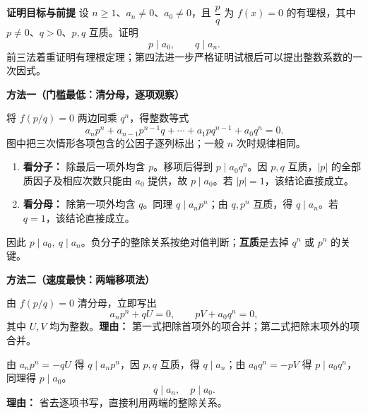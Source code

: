 \begin{proofbox}
    \textbf{\textcolor{CProof}{证明目标与前提}}
    设 $n\ge1$、$a_n\ne0$、$a_0\ne0$，且 $\dfrac pq$ 为 $f(x)=0$ 的有理根，其中 $p\ne0$、$q>0$、$p,q$ 互质。证明
    \[
        p\mid a_0,\qquad q\mid a_n.
    \]
    前三法着重证明有理根定理；第四法进一步严格证明试根后可以提出整数系数的一次因式。

    \medskip
    \textbf{\textcolor{CProof}{方法一（门槛最低：清分母，逐项观察）}}


    将 $f(p/q)=0$ 两边同乘 $q^n$，得整数等式
    \[
      a_np^n+a_{n-1}p^{n-1}q+\cdots+a_1pq^{n-1}+a_0q^n=0.\tag{1}
    \]
    图中把三次情形各项包含的公因子逐列标出；一般 $n$ 次时规律相同。
    \begin{enumerate}[leftmargin=*,itemsep=0.6em]
    \item \textbf{看分子：} 除最后一项外均含 $p$。移项后得到 $p\mid a_0q^n$。因 $p,q$ 互质，$|p|$ 的全部质因子及相应次数只能由 $a_0$ 提供，故 $p\mid a_0$。若 $|p|=1$，该结论直接成立。
    \item \textbf{看分母：} 除第一项外均含 $q$。同理 $q\mid a_np^n$；由 $q,p^n$ 互质，得 $q\mid a_n$。若 $q=1$，该结论直接成立。
    \end{enumerate}
    因此 $\boxed{p\mid a_0,\ q\mid a_n}$。负分子的整除关系按绝对值判断；\textbf{互质}是去掉 $q^n$ 或 $p^n$ 的关键。
\end{proofbox}
\clearpage
\begin{proofbox}
    \textbf{\textcolor{CProof}{方法二（速度最快：两端移项法）}}

    \begin{description}[style=nextline, leftmargin=2.8em, labelsep=0.5em, itemsep=0.48em]
        \item[\textbf{步骤一（抓住整数等式）：}]
            由 $f(p/q)=0$ 清分母，立即写出
            \[
               a_np^n+qU=0,\qquad pV+a_0q^n=0,
            \]
            其中 $U,V$ 均为整数。\textbf{理由：} 第一式把除首项外的项合并；第二式把除末项外的项合并。
        \item[\textbf{步骤二（一步判定）：}]
            由 $a_np^n=-qU$ 得 $q\mid a_np^n$，因 $p,q$ 互质，得 $q\mid a_n$；由 $a_0q^n=-pV$ 得 $p\mid a_0q^n$，同理得 $p\mid a_0$。
            \[
               \boxed{q\mid a_n,\quad p\mid a_0.}
            \]
            \textbf{理由：} 省去逐项书写，直接利用两端的整除关系。
    \end{description}

    \medskip
\end{proofbox}
